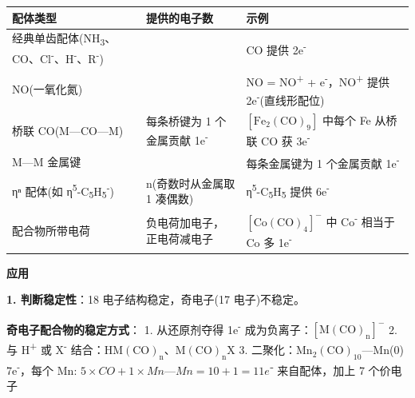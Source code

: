 {\def\LTcaptype{none} %
\begin{longtable}[]{@{}
  >{\raggedright\arraybackslash}p{}
  >{\centering\arraybackslash}p{}
  >{\raggedright\arraybackslash}p{}@{}}
\toprule\noalign{}
\begin{minipage}[b]{\linewidth}\raggedright
配体类型
\end{minipage} & \begin{minipage}[b]{\linewidth}\centering
提供的电子数
\end{minipage} & \begin{minipage}[b]{\linewidth}\raggedright
示例
\end{minipage} \\
\midrule\noalign{}
\endhead
\bottomrule\noalign{}
\endlastfoot
经典单齿配体(NH\textsubscript{3}、CO、Cl\textsuperscript{-}、H\textsuperscript{-}、R\textsuperscript{-}) & 2 & CO 提供 2e\textsuperscript{-} \\
NO(一氧化氮) & 3 & NO = NO\textsuperscript{+} + e\textsuperscript{-}，NO\textsuperscript{+} 提供 2e\textsuperscript{-}(直线形配位) \\
桥联 CO(M---CO---M) & 每条桥键为 1 个金属贡献 1e\textsuperscript{-} & \([\mathrm{Fe_2(CO)_9}]\) 中每个 Fe 从桥联 CO 获 3e\textsuperscript{-} \\
M---M 金属键 & 1 & 每条金属键为 1 个金属贡献 1e\textsuperscript{-} \\
ηⁿ 配体(如 η\textsuperscript{5}-C\textsubscript{5}H\textsubscript{5}\textsuperscript{-}) & n(奇数时从金属取 1 凑偶数) & η\textsuperscript{5}-C\textsubscript{5}H\textsubscript{5} 提供 6e\textsuperscript{-} \\
配合物所带电荷 & 负电荷加电子，正电荷减电子 & \([\mathrm{Co(CO)_4}]^-\) 中 Co\textsuperscript{-} 相当于 Co 多 1e\textsuperscript{-} \\
\end{longtable}
}

\textbf{应用}

\textbf{1. 判断稳定性}：18 电子结构稳定，奇电子(17 电子)不稳定。

\textbf{奇电子配合物的稳定方式}：
1. 从还原剂夺得 1e\textsuperscript{-} 成为负离子：\([\mathrm{M(CO)_n}]^-\)
2. 与 H\textsuperscript{+} 或 X\textsuperscript{-} 结合：\(\mathrm{HM(CO)_n}\)、\(\mathrm{M(CO)_nX}\)
3. 二聚化：\(\mathrm{Mn_2(CO)_{10}}\)---Mn(0) 7e\textsuperscript{-}，每个 Mn: \(5 \times CO + 1 \times Mn—Mn = 10 + 1 = 11e⁻\) 来自配体，加上 7 个价电子 

